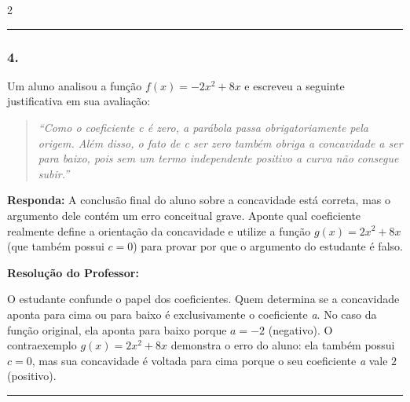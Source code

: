 \begin{multicols*}{2}
\par\vspace{\espacoQuestao}

\noindent\textcolor{CorLinha}{\rule{\linewidth}{0.5pt}} 
\par\vspace{\espacoPreQuestao}
\subsubsection*{4.} Um aluno analisou a função $f(x) = -2x^2 + 8x$ e escreveu a seguinte justificativa em sua avaliação:
\begin{quote}
\textit{``Como o coeficiente c é zero, a parábola passa obrigatoriamente pela origem. Além disso, o fato de c ser zero também obriga a concavidade a ser para baixo, pois sem um termo independente positivo a curva não consegue subir.''}
\end{quote}

\begin{boxresponda}
\textbf{Responda:} A conclusão final do aluno sobre a concavidade está correta, mas o argumento dele contém um erro conceitual grave. Aponte qual coeficiente realmente define a orientação da concavidade e utilize a função $g(x) = 2x^2 + 8x$ (que também possui $c = 0$) para provar por que o argumento do estudante é falso.
\end{boxresponda}

\ifgabarito
    \begin{tcolorbox}[colback=CorTitUm!5, colframe=CorTitUm, boxrule=1pt, arc=4pt, left=6pt, right=6pt, top=6pt, bottom=6pt]
    \small\textbf{\textcolor{CorTitUm}{Resolução do Professor:}}\par\vspace{0.1cm}
    \color{CinzaEscuro}
    O estudante confunde o papel dos coeficientes. Quem determina se a concavidade aponta para cima ou para baixo é exclusivamente o coeficiente \textit{a}. No caso da função original, ela aponta para baixo porque $a = -2$ (negativo). O contraexemplo $g(x) = 2x^2 + 8x$ demonstra o erro do aluno: ela também possui $c = 0$, mas sua concavidade é voltada para cima porque o seu coeficiente \textit{a} vale $2$ (positivo).
    \end{tcolorbox}
\fi

\par\vspace{\espacoQuestao}

\noindent\textcolor{CorLinha}{\rule{\linewidth}{0.5pt}} 
\par\vspace{\espacoPreQuestao}

\end{multicols*}
